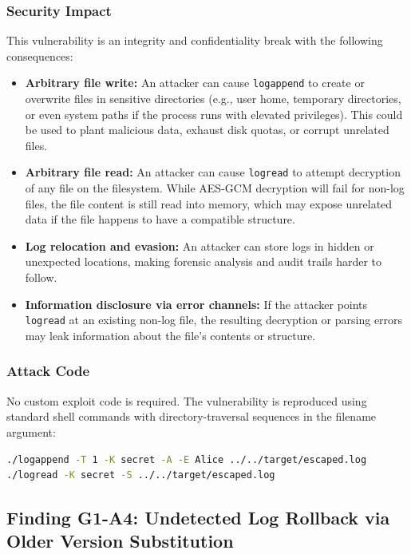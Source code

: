 \documentclass[a4paper, 12pt]{article}
\begin{document}
    \subsubsection{Security Impact}
    This vulnerability is an integrity and confidentiality break with the following consequences:
    \begin{itemize}
        \item \textbf{Arbitrary file write:} An attacker can cause \texttt{logappend} to create or overwrite files in sensitive directories (e.g., user home, temporary directories, or even system paths if the process runs with elevated privileges). This could be used to plant malicious data, exhaust disk quotas, or corrupt unrelated files.
        \item \textbf{Arbitrary file read:} An attacker can cause \texttt{logread} to attempt decryption of any file on the filesystem. While AES-GCM decryption will fail for non-log files, the file content is still read into memory, which may expose unrelated data if the file happens to have a compatible structure.
        \item \textbf{Log relocation and evasion:} An attacker can store logs in hidden or unexpected locations, making forensic analysis and audit trails harder to follow.
        \item \textbf{Information disclosure via error channels:} If the attacker points \texttt{logread} at an existing non-log file, the resulting decryption or parsing errors may leak information about the file's contents or structure.
    \end{itemize}

    \subsubsection{Attack Code}
    No custom exploit code is required. The vulnerability is reproduced using standard shell commands with directory-traversal sequences in the filename argument:
    \begin{lstlisting}[language=bash]
./logappend -T 1 -K secret -A -E Alice ../../target/escaped.log
./logread -K secret -S ../../target/escaped.log
    \end{lstlisting}

    \subsection{Finding G1-A4: Undetected Log Rollback via Older Version Substitution}
\end{document}
